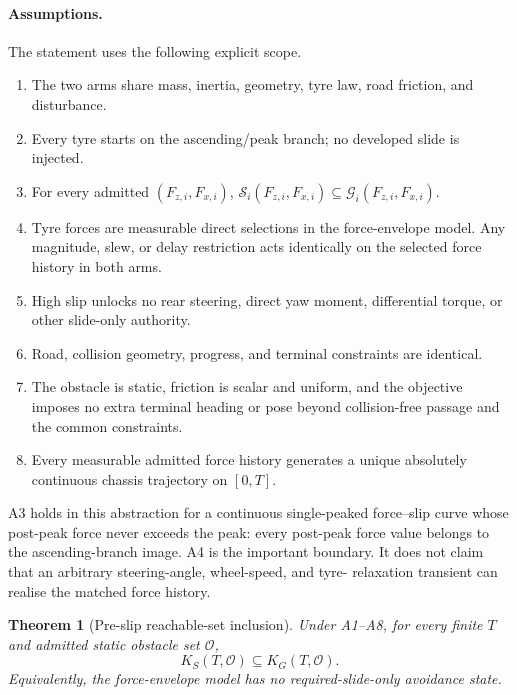 \documentclass[11pt]{article}
\newtheorem{theorem}{Theorem}
\begin{document}
\paragraph{Assumptions.}
The statement uses the following explicit scope.
\begin{enumerate}
  \item[(A1)] The two arms share mass, inertia, geometry, tyre law, road friction, and disturbance.
  \item[(A2)] Every tyre starts on the ascending/peak branch; no developed slide is injected.
  \item[(A3)] For every admitted $(F_{z,i},F_{x,i})$,
  $\mathcal S_i(F_{z,i},F_{x,i})\subseteq\mathcal G_i(F_{z,i},F_{x,i})$.
  \item[(A4)] Tyre forces are measurable direct selections in the force-envelope model. Any
  magnitude, slew, or delay restriction acts identically on the selected force history in both arms.
  \item[(A5)] High slip unlocks no rear steering, direct yaw moment, differential torque, or other
  slide-only authority.
  \item[(A6)] Road, collision geometry, progress, and terminal constraints are identical.
  \item[(A7)] The obstacle is static, friction is scalar and uniform, and the objective imposes no
  extra terminal heading or pose beyond collision-free passage and the common constraints.
  \item[(A8)] Every measurable admitted force history generates a unique absolutely continuous
  chassis trajectory on $[0,T]$.
\end{enumerate}
A3 holds in this abstraction for a continuous single-peaked force--slip curve whose post-peak force
never exceeds the peak: every post-peak force value belongs to the ascending-branch image. A4 is the
important boundary. It does not claim that an arbitrary steering-angle, wheel-speed, and tyre-
relaxation transient can realise the matched force history.

\begin{theorem}[Pre-slip reachable-set inclusion]
Under A1--A8, for every finite $T$ and admitted static obstacle set $\mathcal O$,
\begin{equation}
  K_S(T,\mathcal O)\subseteq K_G(T,\mathcal O).
  \label{eq:preslip-inclusion}
\end{equation}
Equivalently, the force-envelope model has no required-slide-only avoidance state.
\end{theorem}
\end{document}
